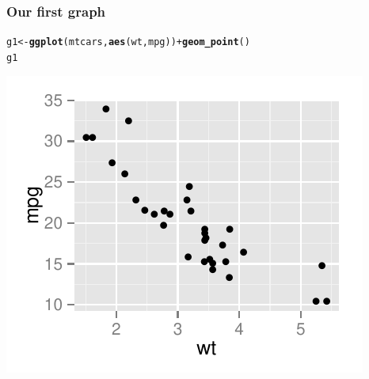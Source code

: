 \documentclass{beamer}\usepackage{graphicx, color}
\makeatletter
\def\maxwidth{ %
  \ifdim\Gin@nat@width>\linewidth
    \linewidth
  \else
    \Gin@nat@width
  \fi
}
\newcommand{\hlfunctioncall}[1]{\textcolor[rgb]{0.501960784313725,0,0.329411764705882}{\textbf{#1}}}%
\newenvironment{kframe}{%
 \def\at@end@of@kframe{}%
 \ifinner\ifhmode%
  \def\at@end@of@kframe{\end{minipage}}%
  \begin{minipage}{\columnwidth}%
 \fi\fi%
 \def\FrameCommand##1{\hskip\@totalleftmargin \hskip-\fboxsep
 \colorbox{shadecolor}{##1}\hskip-\fboxsep
     \hskip-\linewidth \hskip-\@totalleftmargin \hskip\columnwidth}%
 \MakeFramed {\advance\hsize-\width
   \@totalleftmargin\z@ \linewidth\hsize
   \@setminipage}}%
 {\par\unskip\endMakeFramed%
 \at@end@of@kframe}
\newenvironment{knitrout}{}{} %
\makeatother
\begin{document}
\begin{frame}[fragile]
  \frametitle{Our first graph}
\begin{knitrout}
\color{fgcolor}\begin{kframe}
\begin{alltt}
g1 <- \hlfunctioncall{ggplot}(mtcars, \hlfunctioncall{aes}(wt, mpg)) + \hlfunctioncall{geom_point}()
g1
\end{alltt}
\end{kframe}
\includegraphics[width=\maxwidth]{figure/first} 

\end{knitrout}


\end{frame}
\end{document}
